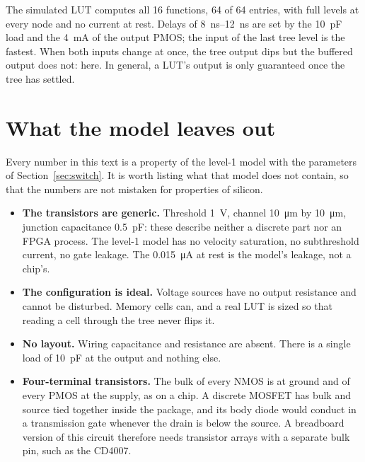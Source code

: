 \documentclass[11pt,a4paper]{article}
\begin{document}
\begin{merke}
The simulated LUT computes all 16 functions, 64 of 64 entries, with
full levels at every node and no current at rest. Delays of
\SIrange{8}{12}{ns} are set by the \SI{10}{pF} load and the \SI{4}{mA}
of the output PMOS; the input of the last tree level is the fastest.
When both inputs change at once, the tree output dips but the buffered
output does not: here. In general, a LUT's output is only guaranteed
once the tree has settled.
\end{merke}

\section{What the model leaves out}
\label{sec:limits}

Every number in this text is a property of the level-1 model with the
parameters of Section~\ref{sec:switch}. It is worth listing what that
model does not contain, so that the numbers are not mistaken for
properties of silicon.

\begin{itemize}
    \item \textbf{The transistors are generic.} Threshold \SI{1}{V},
          channel \SI{10}{\micro m} by \SI{10}{\micro m}, junction
          capacitance \SI{0.5}{pF}: these describe neither a discrete
          part nor an FPGA process. The level-1 model has no velocity
          saturation, no subthreshold current, no gate leakage. The
          \SI{0.015}{\micro A} at rest is the model's leakage, not a
          chip's.
    \item \textbf{The configuration is ideal.} Voltage sources have no
          output resistance and cannot be disturbed. Memory cells can,
          and a real LUT is sized so that reading a cell through the
          tree never flips it.
    \item \textbf{No layout.} Wiring capacitance and resistance are
          absent. There is a single load of \SI{10}{pF} at the output
          and nothing else.
    \item \textbf{Four-terminal transistors.} The bulk of every NMOS is
          at ground and of every PMOS at the supply, as on a chip. A
          discrete MOSFET has bulk and source tied together inside the
          package, and its body diode would conduct in a transmission
          gate whenever the drain is below the source. A breadboard
          version of this circuit therefore needs transistor arrays
          with a separate bulk pin, such as the CD4007.
\end{itemize}
\end{document}
